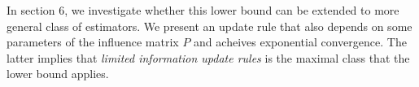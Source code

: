 In section 6, we investigate whether this lower bound can be extended to more
general class of estimators. We present an update rule that also depends on some parameters of the influence matrix $P$ 
and acheives exponential convergence. The latter implies that \emph{limited information update rules}
is the maximal class that the lower bound applies.




